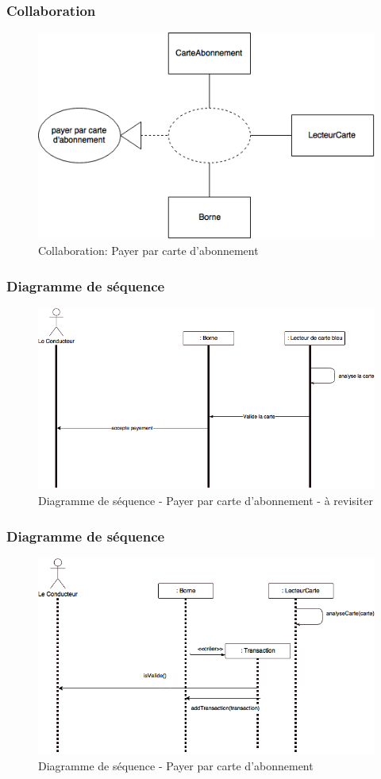 \subsubsection{Collaboration}
\begin{figure}[h]
    \centering
    \includegraphics[scale=0.6]{02_Desenvolvimento/TD2/images/ColaCarteAbonnement.png}
    \caption{Collaboration: Payer par carte d'abonnement}
\end{figure}
\newpage    
\subsubsection{Diagramme de séquence}
\begin{figure}[!htb]
    \centering
    \includegraphics[scale=0.5]{02_Desenvolvimento/TD2/images/DS-payerAbonnement.png}
    \caption{Diagramme de séquence - Payer par carte d'abonnement - à revisiter }
\end{figure}
\subsubsection{Diagramme de séquence}
\begin{figure}[!htb]
    \centering
    \includegraphics[scale=0.5]{02_Desenvolvimento/TD2/images/v2-DS-payerCarteAbonnement.png}
    \caption{Diagramme de séquence - Payer par carte d'abonnement}
\end{figure}